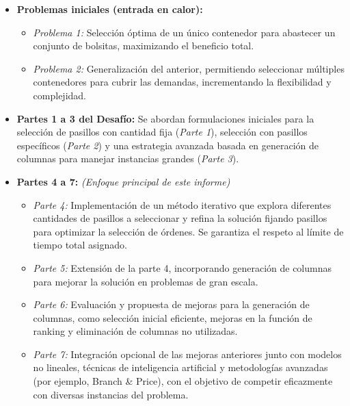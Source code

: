 \documentclass[a4paper,12pt]{article}
\begin{document}
\begin{itemize}
    \item \textbf{Problemas iniciales (entrada en calor):}  
    \begin{itemize}
        \item \textit{Problema 1:} Selección óptima de un único contenedor para abastecer un conjunto de bolsitas, maximizando el beneficio total.  
        \item \textit{Problema 2:} Generalización del anterior, permitiendo seleccionar múltiples contenedores para cubrir las demandas, incrementando la flexibilidad y complejidad.
    \end{itemize}

    \item \textbf{Partes 1 a 3 del Desafío:}  
    Se abordan formulaciones iniciales para la selección de pasillos con cantidad fija (\textit{Parte 1}), selección con pasillos específicos (\textit{Parte 2}) y una estrategia avanzada basada en generación de columnas para manejar instancias grandes (\textit{Parte 3}).

    \item \textbf{Partes 4 a 7:} \textit{(Enfoque principal de este informe)}  
    \begin{itemize}
        \item \textit{Parte 4:} Implementación de un método iterativo que explora diferentes cantidades de pasillos a seleccionar y refina la solución fijando pasillos para optimizar la selección de órdenes. Se garantiza el respeto al límite de tiempo total asignado.
        
        \item \textit{Parte 5:} Extensión de la parte 4, incorporando generación de columnas para mejorar la solución en problemas de gran escala.
        
        \item \textit{Parte 6:} Evaluación y propuesta de mejoras para la generación de columnas, como selección inicial eficiente, mejoras en la función de ranking y eliminación de columnas no utilizadas.
        
        \item \textit{Parte 7:} Integración opcional de las mejoras anteriores junto con modelos no lineales, técnicas de inteligencia artificial y metodologías avanzadas (por ejemplo, Branch \& Price), con el objetivo de competir eficazmente con diversas instancias del problema.
    \end{itemize}
\end{itemize}
\end{document}
